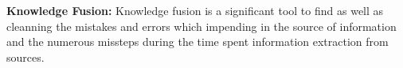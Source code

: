 \vspace{.5cm}
\textbf{Knowledge Fusion: }Knowledge fusion is a significant tool to find as well as cleanning the mistakes and errors which impending in the source of information and the numerous missteps during the time spent information extraction from sources.






